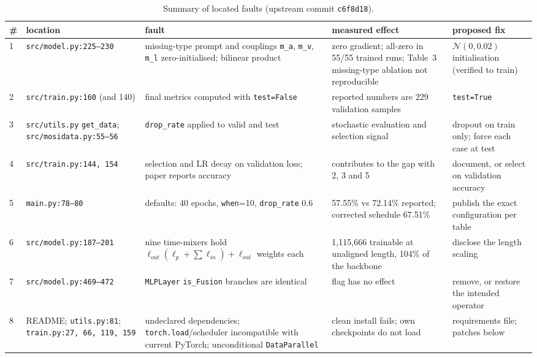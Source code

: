 \documentclass[lettersize,journal]{IEEEtran}
\begin{document}
\begin{table}[!t]
\caption{Summary of located faults (upstream commit \texttt{c6f8d18}).\label{tab:faults}}
\centering
\footnotesize
\begin{tabular}{p{0.3cm}p{3.1cm}p{4.7cm}p{4.3cm}p{3.8cm}}
\toprule
\# & location & fault & measured effect & proposed fix\\
\midrule
1 & \texttt{src/model.py:225--230} & missing-type prompt and couplings \texttt{m\_a}, \texttt{m\_v}, \texttt{m\_l} zero-initialised; bilinear product & zero gradient; all-zero in 55/55 trained runs; Table~3 missing-type ablation not reproducible & $\mathcal{N}(0,0.02)$ initialisation (verified to train)\\
2 & \texttt{src/train.py:160} (and 140) & final metrics computed with \texttt{test=False} & reported numbers are 229 validation samples & \texttt{test=True}\\
3 & \texttt{src/utils.py} \texttt{get\_data}; \texttt{src/mosidata.py:55--56} & \texttt{drop\_rate} applied to valid and test & stochastic evaluation and selection signal & dropout on train only; force each case at test\\
4 & \texttt{src/train.py:144, 154} & selection and LR decay on validation loss; paper reports accuracy & contributes to the gap with 2, 3 and 5 & document, or select on validation accuracy\\
5 & \texttt{main.py:78--80} & defaults: 40 epochs, \texttt{when}=10, \texttt{drop\_rate} 0.6 & 57.55\% vs 72.14\% reported; corrected schedule 67.51\% & publish the exact configuration per table\\
6 & \texttt{src/model.py:187--201} & nine time-mixers hold $\ell_{out}(\ell_p+\sum\ell_{in})+\ell_{out}$ weights each & 1,115,666 trainable at unaligned length, 104\% of the backbone & disclose the length scaling\\
7 & \texttt{src/model.py:469--472} & \texttt{MLPLayer} \texttt{is\_Fusion} branches are identical & flag has no effect & remove, or restore the intended operator\\
8 & README; \texttt{utils.py:81}; \texttt{train.py:27, 66, 119, 159} & undeclared dependencies; \texttt{torch.load}/scheduler incompatible with current PyTorch; unconditional \texttt{DataParallel} & clean install fails; own checkpoints do not load & requirements file; patches below\\
\bottomrule
\end{tabular}
\end{table}
\end{document}
